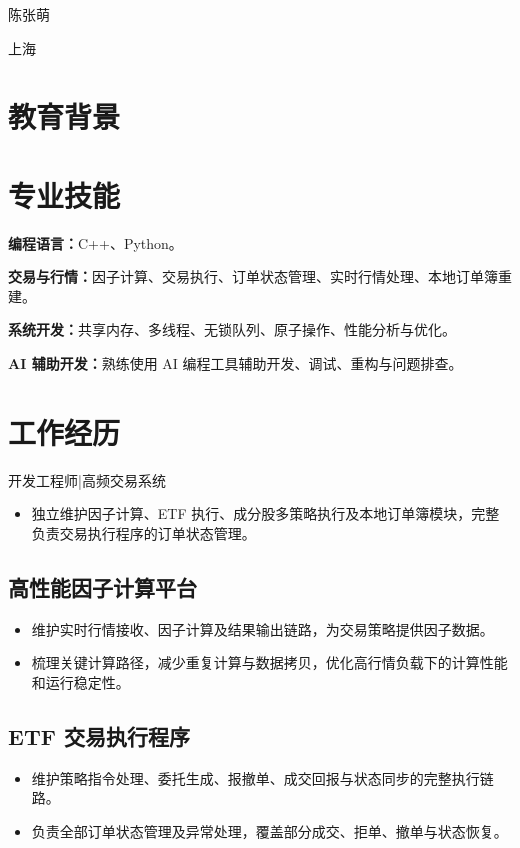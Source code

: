 \documentclass{resume}
\renewcommand{\name}[1]{\centerline{\Huge #1}\vspace{1.25ex}}
\begin{document}
\name{陈张萌}
\begin{center}
  \small {}\quad\textperiodcentered\quad
  \quad\textperiodcentered\quad 上海
\end{center}
\vspace{-0.8em}

\section{教育背景}

\section{专业技能}
\textbf{编程语言：}C++、Python。\par
\textbf{交易与行情：}因子计算、交易执行、订单状态管理、实时行情处理、本地订单簿重建。\par
\textbf{系统开发：}共享内存、多线程、无锁队列、原子操作、性能分析与优化。\par
\textbf{AI 辅助开发：}熟练使用 AI 编程工具辅助开发、调试、重构与问题排查。

\section{工作经历}
开发工程师\quad |\quad 高频交易系统
\begin{itemize}
  \item 独立维护因子计算、ETF 执行、成分股多策略执行及本地订单簿模块，完整负责交易执行程序的订单状态管理。
\end{itemize}

\subsection{高性能因子计算平台}
\begin{itemize}
  \item 维护实时行情接收、因子计算及结果输出链路，为交易策略提供因子数据。
  \item 梳理关键计算路径，减少重复计算与数据拷贝，优化高行情负载下的计算性能和运行稳定性。
\end{itemize}

\subsection{ETF 交易执行程序}
\begin{itemize}
  \item 维护策略指令处理、委托生成、报撤单、成交回报与状态同步的完整执行链路。
  \item 负责全部订单状态管理及异常处理，覆盖部分成交、拒单、撤单与状态恢复。
\end{itemize}
\end{document}
